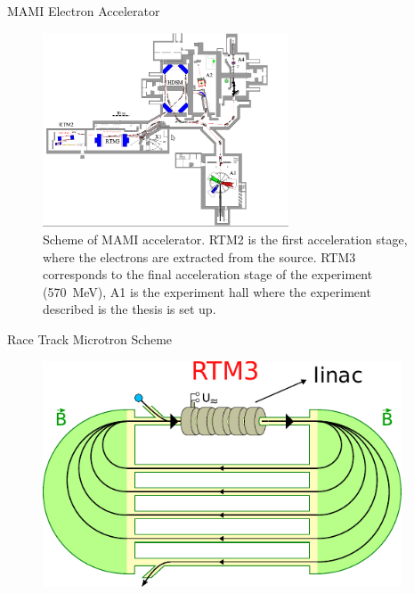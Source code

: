 \documentclass[9pt,a4paper]{beamer}
\begin{document}
\begin{frame}{MAMI Electron Accelerator}

\begin{figure}[hbtp]
\centering
\includegraphics[width = 0.65\textwidth]{figures/mami.png}
\caption{ \footnotesize Scheme of MAMI accelerator. RTM2 is the first acceleration stage, where the electrons are extracted from the source. RTM3 corresponds to the final acceleration stage of the experiment (\SI{570}{\mega \electronvolt}), A1 is the experiment hall where the experiment described is the thesis is set up.}
\end{figure}

\end{frame}

\begin{frame}{Race Track Microtron Scheme}

\begin{figure}[hbtp]
\centering
\includegraphics[width = 0.95\textwidth]{figures/RacetrackMicrotronSketch.pdf}
\end{figure}

\end{frame}
\end{document}
